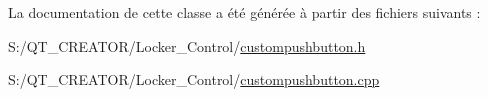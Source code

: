 La documentation de cette classe a été générée à partir des fichiers suivants \+:\begin{DoxyCompactItemize}
\item 
S\+:/\+Q\+T\+\_\+\+C\+R\+E\+A\+T\+O\+R/\+Locker\+\_\+\+Control/\hyperlink{custompushbutton_8h}{custompushbutton.\+h}\item 
S\+:/\+Q\+T\+\_\+\+C\+R\+E\+A\+T\+O\+R/\+Locker\+\_\+\+Control/\hyperlink{custompushbutton_8cpp}{custompushbutton.\+cpp}\end{DoxyCompactItemize}
